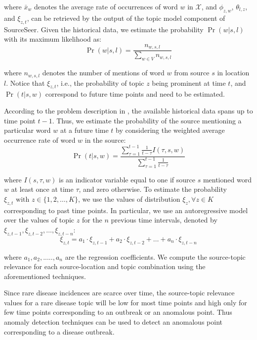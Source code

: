 \documentclass[twoside,leqno,twocolumn]{article}
\newcommand{\fullmodel}{{{\sf SourceSeer}}\xspace}
\begin{document}
\noindent where $\bar{x}_{w}$ denotes the average rate of occurrences of word $w$ in $\mathcal{X}$,  and 
$\phi_{z,w}$, $\theta_{l,z}$, and $\xi_{z,t}$, can be retrieved by the output of the topic model component of \fullmodel.  Given the historical data, we estimate the probability $\Pr(w|s,l)$ with its maximum likelihood as:
{\small \begin{equation}
  \Pr(w|s,l) = \frac{n_{w,s,l}}{\sum_{w\in V}n_{w,s,l}}
\end{equation}}
\vspace{-10pt}

\noindent where $n_{w,s,l}$ denotes the number of mentions of word $w$ from source $s$ in location $l$.
Notice that $\xi_{z,t}$, i.e., the probability of topic $z$ being prominent at time $t$, 
and $\Pr(t|s,w)$ correspond to future time points and need to be estimated.  

According to the problem description in , the available historical 
data spans up to time point $t-1$. Thus, we estimate the probability of the source 
mentioning a particular word $w$ at a future time $t$ by considering the weighted average occurrence rate of word $w$ in the source:
{\small \begin{equation}
\Pr(t|s,w) = \frac{\sum_{\tau = 1}^{t-1} \frac{1}{t - \tau}I(\tau,s,w)}{\sum_{\tau = 1}^{t-1} \frac{1}{t - \tau}}
\label{eq:prob_time}
\end{equation}}
\vspace{-10pt}

\noindent where $I(s,\tau,w)$ is an indicator variable equal to one if source $s$ mentioned word $w$ at least once at time $\tau$, and zero otherwise. 
To estimate the probability $\xi_{z,t} \mbox{ with } z \in \{1, 2, \dots, K\}$, 
we use the values of distribution $\xi_{z}, \forall z \in K$ corresponding to past time points. In particular, we use an autoregressive model over the values of topic $z$ for the $n$ previous time intervals, denoted by $\xi_{z,t-1},\xi_{z,t-2},\dots,\xi_{z,t-n}$:
{\small \begin{equation}
\xi_{z,t}=a_1 \cdot \xi_{z,t-1}+a_2\cdot \xi_{z,t-2}+\dots +a_n\cdot \xi_{z,t-n}
\end{equation}}
\vspace{-10pt}

\noindent where $a_1,a_2,.....,a_n$ are the regression coefficients. We compute the source-topic relevance for each source-location and topic combination using the aforementioned techniques.

Since rare disease incidences are scarce over time, the source-topic relevance values for a rare disease topic will be low for most time points and high only for few time points corresponding to an outbreak or an anomalous point. Thus anomaly detection techniques can be used to detect an anomalous point corresponding to a disease outbreak.
\end{document}
